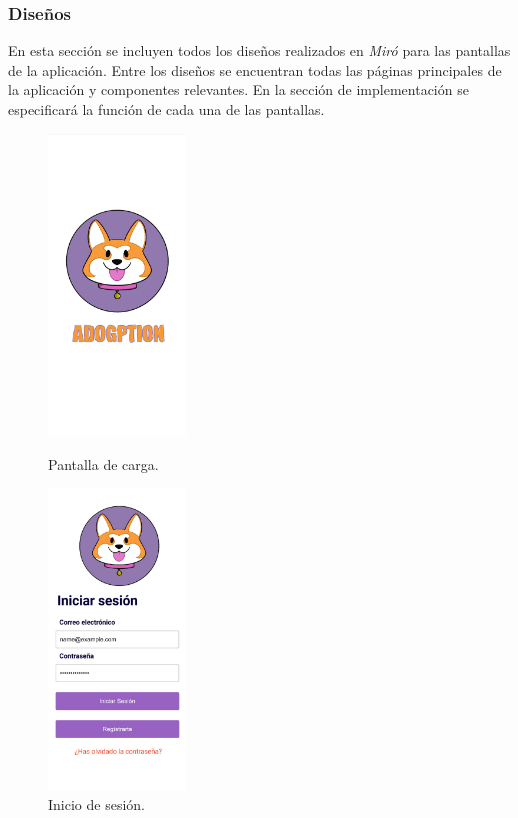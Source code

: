 \documentclass[a4paper, 12pt]{article}
\begin{document}
\newpage
\subsubsection{Diseños}

En esta sección se incluyen todos los diseños realizados en \textit{Miró} para las pantallas de la aplicación. Entre los diseños se encuentran todas las páginas principales de la aplicación y componentes relevantes. En la sección de implementación se especificará la función de cada una de las pantallas.


\begin{figure}[H]
   	\begin{minipage}{0.48\textwidth}
		\begin{center}
			{\includegraphics[height=8cm]{SplashScreen.jpg}\par}
			\caption{Pantalla de carga.}
			\medskip
		\end{center}  
	\end{minipage}\hfill
   	\begin{minipage}{0.48\textwidth}
		\begin{center}
			{\includegraphics[height=8cm]{Login.jpg}\par}
			\caption{Inicio de sesión.}
			\medskip
		\end{center}  
	\end{minipage}\hfill
\end{figure}
\end{document}

